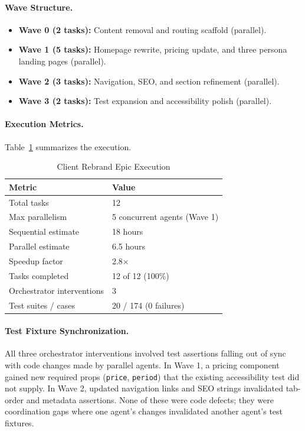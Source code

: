\paragraph{Wave Structure.}
\begin{itemize}
    \item \textbf{Wave 0 (2 tasks):} Content removal and routing scaffold
    (parallel).
    \item \textbf{Wave 1 (5 tasks):} Homepage rewrite, pricing update, and three
    persona landing pages (parallel).
    \item \textbf{Wave 2 (3 tasks):} Navigation, SEO, and section refinement
    (parallel).
    \item \textbf{Wave 3 (2 tasks):} Test expansion and accessibility polish
    (parallel).
\end{itemize}

\paragraph{Execution Metrics.}
Table~\ref{tab:rebrand-metrics} summarizes the execution.

\begin{table}[htbp]
\centering
\caption{Client Rebrand Epic Execution}
\label{tab:rebrand-metrics}
\begin{tabular}{ll}
\toprule
\textbf{Metric} & \textbf{Value} \\
\midrule
Total tasks & 12 \\
Max parallelism & 5 concurrent agents (Wave 1) \\
Sequential estimate & 18 hours \\
Parallel estimate & 6.5 hours \\
Speedup factor & 2.8$\times$ \\
Tasks completed & 12 of 12 (100\%) \\
Orchestrator interventions & 3 \\
Test suites / cases & 20 / 174 (0 failures) \\
\bottomrule
\end{tabular}
\end{table}

\needspace{4cm}
\paragraph{Test Fixture Synchronization.}
All three orchestrator interventions involved test assertions falling out
of sync with code changes made by parallel agents. In Wave 1, a pricing
component gained new required props (\texttt{price}, \texttt{period}) that
the existing accessibility test did not supply. In Wave 2, updated navigation
links and SEO strings invalidated tab-order and metadata assertions. None of
these were code defects; they were coordination gaps where one agent's
changes invalidated another agent's test fixtures.

